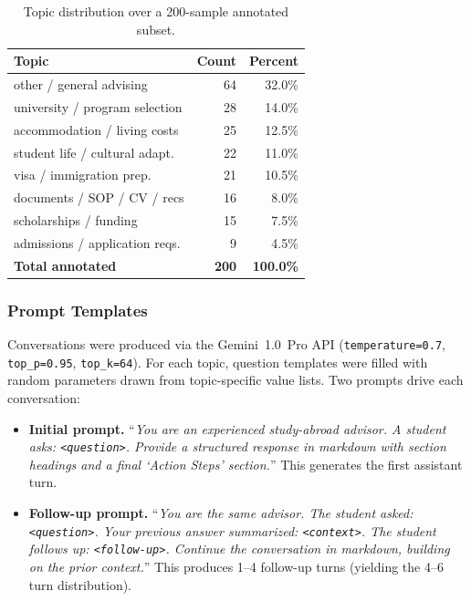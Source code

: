\documentclass[11pt, a4paper]{article}
\begin{document}
\begin{table}[H]
\centering
\caption{Topic distribution over a 200-sample annotated subset.}
\label{tab:topic-dist}
\begin{tabular}{lrr}
\hline
\textbf{Topic} & \textbf{Count} & \textbf{Percent} \\
\hline
other / general advising        & 64 & 32.0\% \\
university / program selection  & 28 & 14.0\% \\
accommodation / living costs    & 25 & 12.5\% \\
student life / cultural adapt.  & 22 & 11.0\% \\
visa / immigration prep.        & 21 & 10.5\% \\
documents / SOP / CV / recs     & 16 &  8.0\% \\
scholarships / funding          & 15 &  7.5\% \\
admissions / application reqs.  &  9 &  4.5\% \\
\hline
\textbf{Total annotated}        & \textbf{200} & \textbf{100.0\%} \\
\hline
\end{tabular}
\end{table}

\subsubsection{Prompt Templates}
Conversations were produced via the Gemini~1.0~Pro API (\texttt{temperature=0.7}, \texttt{top\_p=0.95}, \texttt{top\_k=64}). For each topic, question templates were filled with random parameters drawn from topic-specific value lists. Two prompts drive each conversation:

\begin{itemize}
    \item \textbf{Initial prompt.} ``\textit{You are an experienced study-abroad advisor. A student asks: \texttt{<question>}. Provide a structured response in markdown with section headings and a final `Action Steps' section.}'' This generates the first assistant turn.
    \item \textbf{Follow-up prompt.} ``\textit{You are the same advisor. The student asked: \texttt{<question>}. Your previous answer summarized: \texttt{<context>}. The student follows up: \texttt{<follow-up>}. Continue the conversation in markdown, building on the prior context.}'' This produces 1--4 follow-up turns (yielding the 4--6 turn distribution).
\end{itemize}
\end{document}
